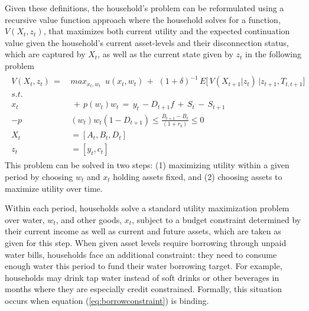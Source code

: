\documentclass[12pt]{article}
\begin{document}
Given these definitions, the household's problem can be reformulated using a recursive value function approach where the household solves for a function, $V(X_t,z_t)$, that maximizes both current utility and the expected continuation value given the household's current asset-levels and their disconnection status, which are captured by $X_t$, as well as the current state given by $z_t$ in the following problem
\begin{align}\label{eq:valmax}
\begin{split}
V(X_t,z_t) \,=\, &max_{x_t,w_t}  \,\,\, u(x_t,w_t) \,+\,\, (1+\delta)^{-1} \, E \Big[\, V(X_{t+1}|z_{t})\,\Big| z_{t+1}, T_{t,t+1} \Big]
\\
s.t.& \\
x_t & \, + \, p(w_t) w_t \, = \, y_t \, - D_{t+1} f  \, + \, S_t \, - \, S_{t+1} \\
-p&(w_t) w_t (1-D_{t+1}) \leq \frac{B_{t+1}-B_t}{(1+r_b)} \leq 0  \\
X_t &= [A_{t},B_{t},D_{t}] \\
z_t &= [y_t,c_t]
\end{split} 
\end{align}
This problem can be solved in two steps: (1) maximizing utility within a given period by choosing $w_t$ and $x_t$ holding assets fixed, and (2) choosing assets to maximize utility over time.

Within each period, households solve a standard utility maximization problem over water, $w_t$, and other goods, $x_t$, subject to a budget constraint determined by their current income as well as current and future assets, which are taken as given for this step.  When given asset levels require borrowing through unpaid water bills, households face an additional constraint: they need to consume enough water this period to fund their water borrowing target.  For example, households may drink tap water instead of soft drinks or other beverages in months where they are especially credit constrained.  Formally, this situation occurs when equation (\ref{eq:borrowconstraint}) is binding.  
\end{document}
